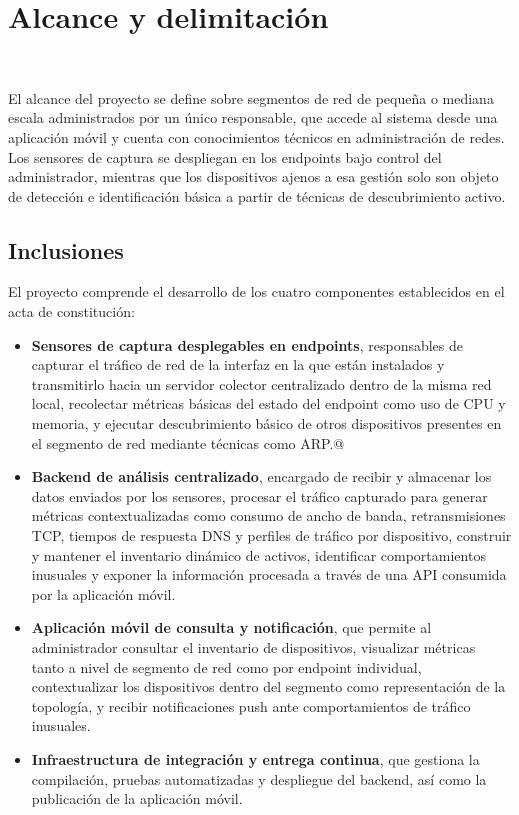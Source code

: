 \section{Alcance y delimitación}
~\label{sec:alcance}

El alcance del proyecto se define sobre segmentos de red 
de pequeña o mediana escala administrados por un único 
responsable, que accede al sistema desde una aplicación móvil y cuenta 
con conocimientos técnicos en administración de redes. Los sensores de 
captura se despliegan en los endpoints bajo control del administrador, 
mientras que los dispositivos ajenos a esa gestión solo son objeto de 
detección e identificación básica a partir de técnicas de 
descubrimiento activo.

\subsection{Inclusiones}

El proyecto comprende el desarrollo de los cuatro componentes 
establecidos en el acta de constitución:

\begin{itemize}
    \item \textbf{Sensores de captura desplegables en endpoints}, 
    responsables de capturar el tráfico de red de la interfaz en la 
    que están instalados y transmitirlo hacia un servidor colector 
    centralizado dentro de la misma red local, recolectar métricas 
    básicas del estado del endpoint como uso de CPU y memoria, y 
    ejecutar descubrimiento básico de otros dispositivos presentes en 
    el segmento de red mediante técnicas como ARP.@

    \item \textbf{Backend de análisis centralizado}, encargado de 
    recibir y almacenar los datos enviados por los sensores, procesar 
    el tráfico capturado para generar métricas contextualizadas como 
    consumo de ancho de banda, retransmisiones TCP, tiempos de 
    respuesta DNS y perfiles de tráfico por dispositivo, construir y 
    mantener el inventario dinámico de activos, identificar 
    comportamientos inusuales y exponer la información procesada a 
    través de una API consumida por la aplicación móvil.

    \item \textbf{Aplicación móvil de consulta y notificación}, que 
    permite al administrador consultar el inventario de dispositivos, 
    visualizar métricas tanto a nivel de segmento de red como por 
    endpoint individual, contextualizar los dispositivos dentro del 
    segmento como representación de la topología, y recibir 
    notificaciones push ante comportamientos de tráfico inusuales.

    \item \textbf{Infraestructura de integración y entrega continua}, 
    que gestiona la compilación, pruebas automatizadas y despliegue 
    del backend, así como la publicación de la aplicación móvil.
\end{itemize}

